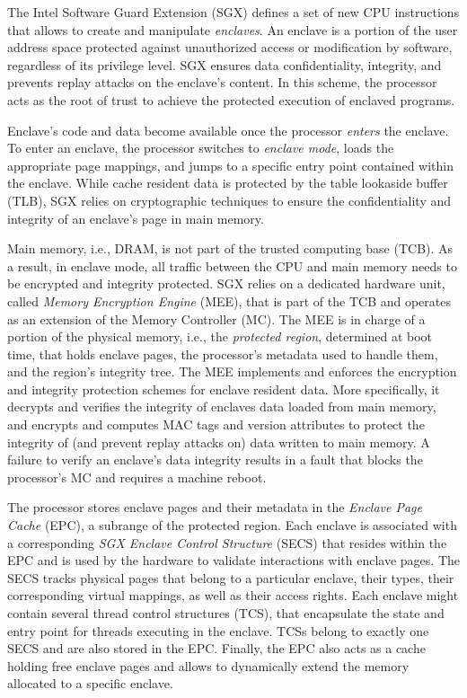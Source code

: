 % 
The Intel Software Guard Extension (SGX) defines a set of new CPU instructions that allows to create and manipulate \emph{enclaves}.
An enclave is a portion of the user address space protected against unauthorized access or modification by software, regardless of its privilege level.
SGX ensures data confidentiality, integrity, and prevents replay attacks on the enclave's content.
In this scheme, the processor acts as the root of trust to achieve the protected execution of enclaved programs.

Enclave's code and data become available once the processor \emph{enters} the enclave.
To enter an enclave, the processor switches to \emph{enclave mode}, loads the appropriate page mappings, and jumps to a specific entry point contained within the enclave.
While cache resident data is protected by the table lookaside buffer (TLB), SGX relies on cryptographic techniques to ensure the confidentiality and integrity of an enclave's page in main memory.

Main memory, i.e., DRAM, is not part of the trusted computing base (TCB).
As a result, in enclave mode, all traffic between the CPU and main memory needs to be encrypted and integrity protected.
SGX relies on a dedicated hardware unit, called \emph{Memory Encryption Engine} (MEE), that is part of the TCB and operates as an extension of the Memory Controller (MC).
The MEE is in charge of a portion of the physical memory, i.e., the \emph{protected region}, determined at boot time, that holds enclave pages, the processor's metadata used to handle them, and the region's integrity tree.
The MEE implements and enforces the encryption and integrity protection schemes for enclave resident data.
More specifically, it decrypts and verifies the integrity of enclaves data loaded from main memory, and encrypts and computes MAC tags and version attributes to protect the integrity of (and prevent replay attacks on) data written to main memory.
A failure to verify an enclave's data integrity results in a fault that blocks the processor's MC and requires a machine reboot.

The processor stores enclave pages and their metadata in the \emph{Enclave Page Cache} (EPC), a subrange of the protected region.
Each enclave is associated with a corresponding \emph{SGX Enclave Control Structure} (SECS) that resides within the EPC and is used by the hardware to validate interactions with enclave pages.
The SECS tracks physical pages that belong to a particular enclave, their types, their corresponding virtual mappings, as well as their access rights.
Each enclave might contain several thread control structures (TCS), that encapsulate the state and entry point for threads executing in the enclave.
TCSs belong to exactly one SECS and are also stored in the EPC.
Finally, the EPC also acts as a cache holding free enclave pages and allows to dynamically extend the memory allocated to a specific enclave.

